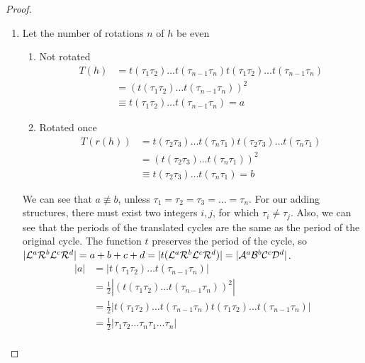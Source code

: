 \begin{proof}
	\begin{enumerate}
		\item Let the number of rotations $n$ of $h$ be even
		      \begin{enumerate}[label=\alph*)]
			      \item Not rotated
			            \begin{align*}
				            T(h) & = t(\tau_1\tau_2) \dots t(\tau_{n-1}\tau_n) t(\tau_1\tau_2) \dots t(\tau_{n-1}\tau_n) \\
				                 & = (t(\tau_1\tau_2) \dots t(\tau_{n-1}\tau_n))^2                                       \\
				                 & \equiv t(\tau_1\tau_2) \dots t(\tau_{n-1}\tau_n) = a
			            \end{align*}
			      \item Rotated once
			            \begin{align*}
				            T(r(h)) & = t(\tau_2\tau_3) \dots t(\tau_{n}\tau_1) t(\tau_2\tau_3) \dots t(\tau_{n}\tau_1) \\
				                    & = (t(\tau_2\tau_3) \dots t(\tau_{n}\tau_1))^2                                     \\
				                    & \equiv t(\tau_2\tau_3) \dots t(\tau_{n}\tau_1) = b
			            \end{align*}
		      \end{enumerate}
		      We can see that $a \nequiv b$, unless $\tau_1 = \tau_2 = \tau_3 = \dots = \tau_n$.
		      For our adding structures, there must exist two integers $i, j$, for which $\tau_i \neq \tau_j$.
		      Also, we can see that the periods of the translated cycles are the same as the period of the original cycle.
		      The function $t$ preserves the period of the cycle, so $|\mathcal{L}^a\mathcal{R}^b\mathcal{L}^c\mathcal{R}^d| = a + b + c + d = |t(\mathcal{L}^a\mathcal{R}^b\mathcal{L}^c\mathcal{R}^d)| = |\mathcal{A}^a\mathcal{B}^b\mathcal{C}^c\mathcal{D}^d|$.
		      \begin{align*}
			      |a| & = |t(\tau_1\tau_2) \dots t(\tau_{n-1}\tau_n)|                                                       \\
			          & = \frac{1}{2} |(t(\tau_1\tau_2) \dots t(\tau_{n-1}\tau_n))^2|                                       \\
			          & = \frac{1}{2} |t(\tau_1\tau_2) \dots t(\tau_{n-1}\tau_n) t(\tau_1\tau_2) \dots t(\tau_{n-1}\tau_n)| \\
			          & = \frac{1}{2} |\tau_1\tau_2 \dots \tau_n\tau_1 \dots \tau_n|                                        \\

\end{align*}
\end{enumerate}
\end{proof}
